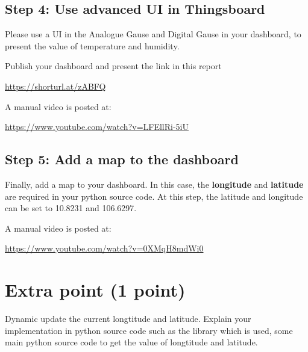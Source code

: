 \documentclass[a4paper,11pt]{article}
\theoremstyle{mytheor}
\begin{document}
\subsection{Step 4: Use advanced UI in Thingsboard}
Please use a UI in the Analogue Gause and Digital Gause in your dashboard, to present the value of temperature and humidity.

Publish your dashboard and present the link in this report
\begin{center}
    \url{https://shorturl.at/zABFQ}
\end{center}

A manual video is posted at:
\begin{center}
    \url{https://www.youtube.com/watch?v=LFEllRi-5iU}
\end{center}

\subsection{Step 5: Add a map to the dashboard}
Finally, add a map to your dashboard. In this case, the \textbf{longitude} and \textbf{latitude} are required in your python source code. At this step, the latitude and longitude can be set to 10.8231 and 106.6297.

A manual video is posted at:
\begin{center}
    \url{https://www.youtube.com/watch?v=0XMqH8mdWi0}
\end{center}

\section{Extra point (1 point)}
Dynamic update the current longtitude and latitude. Explain your implementation in python source code such as the library which is used, some main python source code to get the value of longtitude and latitude.
\end{document}
